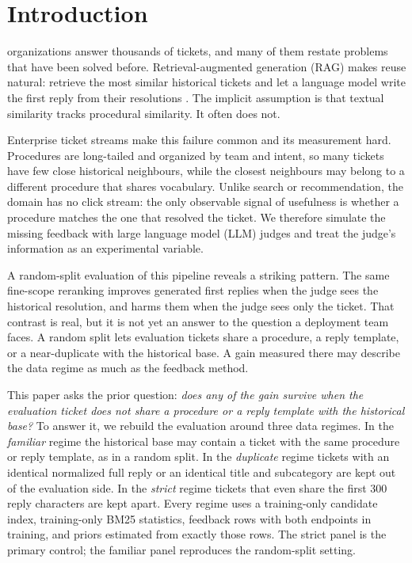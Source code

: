 \section{Introduction}
\label{sec:introduction}
 organizations answer thousands of tickets, and many of them
restate problems that have been solved before. Retrieval-augmented generation
(RAG) makes reuse natural: retrieve the most similar historical tickets and let a
language model write the first reply from their resolutions
\cite{b1,b31}. The implicit assumption is that textual similarity tracks
procedural similarity. It often does not.

Enterprise ticket streams make this failure common and its measurement hard.
Procedures are long-tailed and organized by team and intent, so many tickets have
few close historical neighbours, while the closest neighbours may belong to a
different procedure that shares vocabulary. Unlike search or recommendation, the
domain has no click stream: the only observable signal of usefulness is whether a
procedure matches the one that resolved the ticket. We therefore simulate the
missing feedback with large language model (LLM) judges and treat the judge's
information as an experimental variable.

A random-split evaluation of this pipeline reveals a striking pattern. The same
fine-scope reranking improves generated first replies when the judge sees the
historical resolution, and harms them when the judge sees only the ticket. That contrast is real, but it is not yet an answer to the question a
deployment team faces. A random split lets evaluation tickets share a
procedure, a reply template, or a near-duplicate with the historical base. A gain
measured there may describe the data regime as much as the feedback method.

This paper asks the prior question: \emph{does any of the gain survive when the
evaluation ticket does not share a procedure or a reply template with the
historical base?} To answer it, we rebuild the evaluation around three data
regimes. In the \emph{familiar} regime the historical base may contain a ticket
with the same procedure or reply template, as in a random split. In the
\emph{duplicate} regime tickets with an identical normalized full reply or an
identical title and subcategory are kept out of the evaluation side. In the
\emph{strict} regime tickets that even share the first 300 reply characters are
kept apart. Every regime uses a training-only candidate index, training-only BM25
statistics, feedback rows with both endpoints in training, and priors estimated
from exactly those rows. The strict panel is the primary control; the familiar
panel reproduces the random-split setting.

